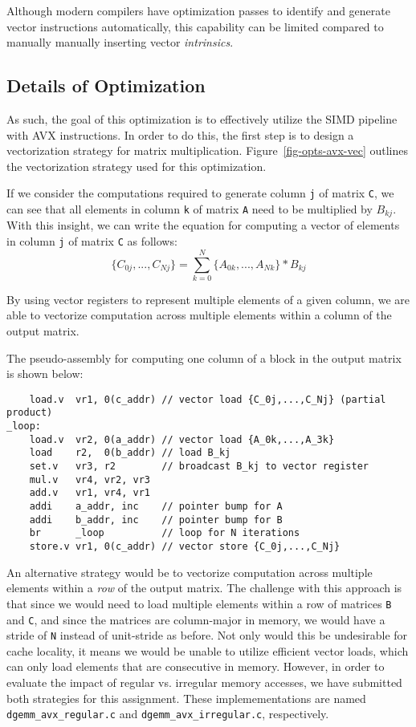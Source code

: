 Although modern compilers have optimization passes to identify and
generate vector instructions automatically, this capability can be
limited compared to manually manually inserting vector
\emph{intrinsics}.
\medskip

\subsection{Details of Optimization}


As such, the goal of this optimization is to effectively utilize the SIMD
pipeline with AVX instructions. In order to do this, the first step is to
design a vectorization strategy for matrix
multiplication. Figure~\ref{fig-opts-avx-vec} outlines the
vectorization strategy used for this optimization.
\smallskip

If we consider the computations required to generate column {\tt{j}} of
matrix {\tt{C}}, we can see that all elements in column {\tt{k}} of matrix
{\tt{A}} need to be multiplied by $B_{kj}$. With this insight, we can
write the equation for computing a vector of elements in column {\tt{j}} of
matrix {\tt{C}} as follows:
\[
\{C_{0j},...,C_{Nj}\} = \sum_{k=0}^{N}\{A_{0k},...,A_{Nk}\}*B_{kj}
\]
\smallskip

By using vector registers to represent multiple elements of a given
column, we are able to vectorize computation across multiple elements
within a column of the output matrix.
\smallskip

The pseudo-assembly for computing one column of a block in the output
matrix is shown below:
\smallskip

\begin{verbatim}
    load.v  vr1, 0(c_addr) // vector load {C_0j,...,C_Nj} (partial product)
_loop:
    load.v  vr2, 0(a_addr) // vector load {A_0k,...,A_3k}
    load    r2,  0(b_addr) // load B_kj
    set.v   vr3, r2        // broadcast B_kj to vector register
    mul.v   vr4, vr2, vr3
    add.v   vr1, vr4, vr1
    addi    a_addr, inc    // pointer bump for A
    addi    b_addr, inc    // pointer bump for B
    br      _loop          // loop for N iterations
    store.v vr1, 0(c_addr) // vector store {C_0j,...,C_Nj}
\end{verbatim}
\smallskip

An alternative strategy would be to vectorize computation across
multiple elements within a \emph{row} of the output matrix. The challenge
with this approach is that since we would need to load multiple elements
within a row of matrices {\tt{B}} and {\tt{C}}, and since the matrices
are column-major in memory, we would have a stride of {\tt{N}} instead of
unit-stride as before. Not only would this be undesirable for cache
locality, it means we would be unable to utilize efficient vector loads,
which can only load elements that are consecutive in memory. However, in
order to evaluate the impact of regular vs. irregular memory accesses, we
have submitted both strategies for this assignment. These
implemementations are named {\tt{dgemm\_avx\_regular.c}} and
{\tt{dgemm\_avx\_irregular.c}}, respectively.
\smallskip

